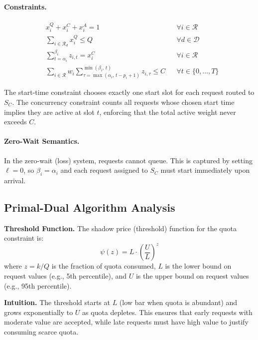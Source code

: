 \paragraph{Constraints.}
\begin{align}
& x_i^Q + x_i^C + x_i^A = 1 && \forall i \in \mathcal{R} \tag{Assignment} \\
& \sum_{i \in \mathcal{R}_d} x_i^Q \leq Q && \forall d \in \mathcal{D} \tag{Daily Quota} \\
& \sum_{t=\alpha_i}^{\beta_i} z_{i,t} = x_i^C && \forall i \in \mathcal{R} \tag{Start Time} \\
& \sum_{i \in \mathcal{R}} w_i \sum_{\tau=\max(\alpha_i,\, t-\hat{p}_i+1)}^{\min(\beta_i,\, t)} z_{i,\tau} \le C
&& \forall t \in \{0,\dots,T\} \tag{Concurrency}
\end{align}

The start-time constraint chooses exactly one start slot for each request routed to $S_C$.
The concurrency constraint counts all requests whose chosen start time implies they are active
at slot $t$, enforcing that the total active weight never exceeds $C$.

\paragraph{Zero-Wait Semantics.} In the zero-wait (loss) system, requests cannot queue. This is
captured by setting $\ell=0$, so $\beta_i=\alpha_i$ and each request assigned to $S_C$ must
start immediately upon arrival.

\subsection{Primal-Dual Algorithm Analysis}
\label{app:primal_dual}

\textbf{Threshold Function.}
The shadow price (threshold) function for the quota constraint is:
\[
\psi(z) = L \cdot \left(\frac{U}{L}\right)^z
\]
where $z = k/Q$ is the fraction of quota consumed, $L$ is the lower bound on request values (e.g., 5th percentile), and $U$ is the upper bound on request values (e.g., 95th percentile).

\textbf{Intuition.} The threshold starts at $L$ (low bar when quota is abundant) and grows exponentially to $U$ as quota depletes. This ensures that early requests with moderate value are accepted, while late requests must have high value to justify consuming scarce quota.

